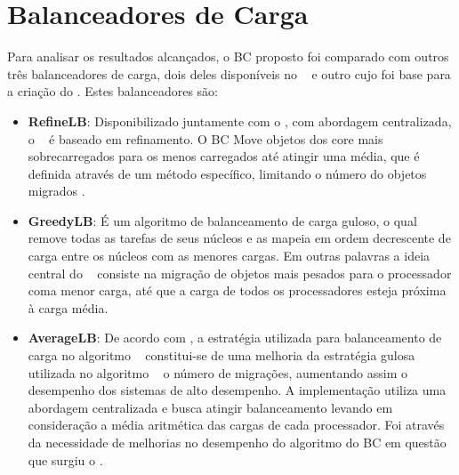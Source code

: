 \section{Balanceadores de Carga}
Para analisar os resultados alcançados, o BC proposto foi comparado com outros três balanceadores de carga, dois deles disponíveis no \charm~ e outro cujo foi base para a criação do \newlb. Estes balanceadores são:
\begin{itemize}
	\item \textbf{RefineLB}: Disponibilizado juntamente com o \charm, com abordagem centralizada, o ~ é baseado em refinamento. O BC Move objetos dos core mais sobrecarregados para os menos carregados até atingir uma média, que é definida através de um método específico, limitando o número do objetos migrados \cite{arruda2015balanceamento}.
	
	\item \textbf{GreedyLB}: É um algoritmo de balanceamento de carga guloso, o qual remove todas as tarefas de seus núcleos e as mapeia em ordem decrescente de carga entre os núcleos com as menores cargas\cite{torres2016}. Em outras palavras a ideia central do \greedylb~ consiste na migração de objetos mais pesados para o processador coma menor carga, até que a carga de todos os processadores esteja próxima à carga média.
		
	\item \textbf{AverageLB}: De acordo com \cite{arruda2015WSCAD}, a estratégia utilizada para balanceamento de carga no algoritmo \averagelb~ constitui-se de uma melhoria da estratégia gulosa utilizada no algoritmo \greedylb~ o número de migrações, aumentando assim o desempenho dos sistemas de alto desempenho. A implementação utiliza uma abordagem centralizada e busca atingir balanceamento levando em consideração a média aritmética das cargas de cada processador. Foi através da necessidade de melhorias no desempenho do algoritmo do BC em questão que surgiu o \newlb.  
\end{itemize}